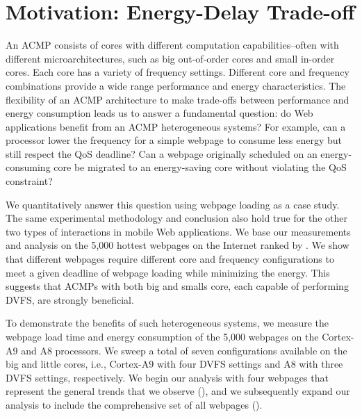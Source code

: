 \section{Motivation: Energy-Delay Trade-off}
\label{sec:runtime:char}



An ACMP consists of cores with different computation capabilities--often with different microarchitectures, such as big out-of-order cores and small in-order cores. Each core has a variety of frequency settings. Different core and frequency combinations provide a wide range performance and energy characteristics. The flexibility of an ACMP architecture to make trade-offs between performance and energy consumption leads us to answer a fundamental question: do Web applications benefit from an ACMP heterogeneous systems?  For example, can a processor lower the frequency for a simple webpage to consume less energy but still respect the QoS deadline? Can a webpage originally scheduled on an energy-consuming core be migrated to an energy-saving core without violating the QoS constraint?

We quantitatively answer this question using webpage loading as a case study. The same experimental methodology and conclusion also hold true for the other two types of interactions in mobile Web applications. We base our measurements and analysis on the 5,000 hottest webpages on the Internet ranked by . We show that different webpages require different core and frequency configurations to meet a given deadline of webpage loading while minimizing the energy. This suggests that ACMPs with both big and smalls core, each capable of performing DVFS, are strongly beneficial.

To demonstrate the benefits of such heterogeneous systems, we measure the webpage load time and energy consumption of the 5,000 webpages on the Cortex-A9 and A8 processors. We sweep a total of seven configurations available on the big and little cores, i.e., Cortex-A9 with four DVFS settings and A8 with three DVFS settings, respectively. We begin our analysis with four webpages that represent the general trends that we observe (), and we subsequently expand our analysis to include the comprehensive set of all webpages ().

